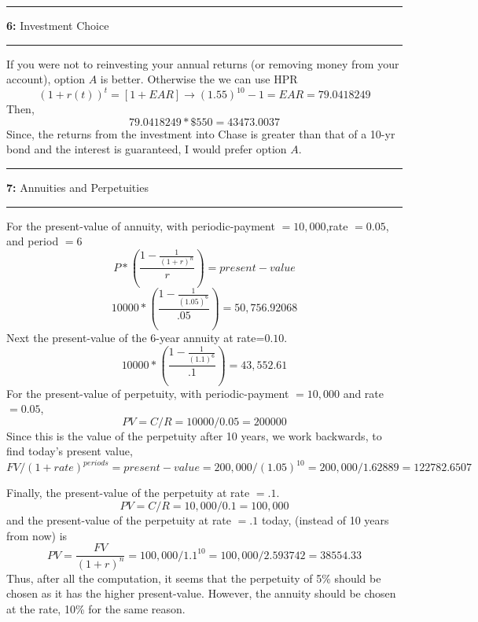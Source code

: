 \documentclass[11pt]{article}
\newcommand\question[2]{\vspace{.25in}\hrule\textbf{#1: } #2\vspace{.5em}\hrule\vspace{.10in}}
\begin{document}
\question{6}{Investment Choice} 
If you were not to reinvesting your annual returns (or removing money from your account), option $A$ is better. Otherwise the we can use HPR
$$ 
(1 + r(t))^{t} = [1+EAR] \rightarrow (1.55)^{10} - 1= EAR = 79.0418249
$$ 
Then, 
\[
    79.0418249 * \$550 = 43473.0037
\]
Since, the returns from the investment into Chase is greater than that of a 10-yr bond and the interest is 
guaranteed, I would prefer option $A$.


\question{7}{Annuities and Perpetuities} 
For the present-value of annuity, with periodic-payment $=10,000$,rate $=0.05$, and period $=6$
\[
    P * (\frac{1-\frac{1}{(1+r)^{n}}}{r}) = present-value
\]
\[
    10000 * (\frac{1-\frac{1}{(1.05)^{6}}}{.05}) = 50,756.92068
\]
Next the present-value of the 6-year annuity at rate=$0.10$. 
\[
    10000 * (\frac{1-\frac{1}{(1.1)^{6}}}{.1}) = 43,552.61
\]
For the present-value of perpetuity, with periodic-payment $=10,000$ and rate $=0.05$,
\[
    PV = C / R = 10000 / 0.05 =  200000
\]
Since this is the value of the perpetuity after 10 years, we work backwards, to find today's present value,
\[
    FV / (1+rate)^{periods} = present-value = 200,000/(1.05)^10 = 200,000/1.62889 = 122782.6507
\]

Finally, the present-value of the perpetuity at rate $=.1$.
\[
    PV = C / R = 10,000 / 0.1 = 100,000
\]
and the present-value of the perpetuity at rate $=.1$ today, (instead of 10 years from now) is
\[
    PV = \frac{FV}{(1+r)^n} = 100,000 / 1.1^{10} = 100,000 / 2.593742 = 38554.33
\]
Thus, after all the computation, it seems that the perpetuity of 5\% should be chosen as it has the higher present-value. 
However, the annuity should be chosen at the rate, 10\% for the same reason.
\end{document}
